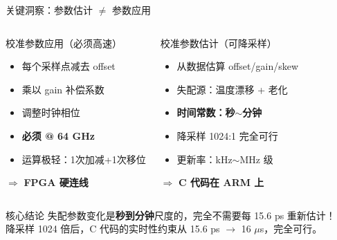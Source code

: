 \documentclass[table,UTF8,11pt,aspectratio=169]{beamer}
\begin{document}
\begin{frame}{关键洞察：参数估计 $\neq$ 参数应用}
\begin{columns}[T]
\begin{block}{校准参数应用（必须高速）}
\begin{itemize}
    \item 每个采样点减去 offset
    \item 乘以 gain 补偿系数
    \item 调整时钟相位
    \item \textbf{必须 @ 64 GHz}
    \item 运算极轻：1次加减+1次移位
\end{itemize}
\centering $\Rightarrow$ \textbf{FPGA 硬连线}
\end{block}

\begin{block}{校准参数估计（可降采样）}
\begin{itemize}
    \item 从数据估算 offset/gain/skew
    \item 失配源：温度漂移 + 老化
    \item \textbf{时间常数：秒$\sim$分钟}
    \item 降采样 1024:1 完全可行
    \item 更新率：kHz$\sim$MHz 级
\end{itemize}
\centering $\Rightarrow$ \textbf{C 代码在 ARM 上}
\end{block}
\end{columns}

\vspace{0.3cm}
\begin{alertblock}{核心结论}
失配参数变化是\textbf{秒到分钟}尺度的，完全不需要每 15.6 ps 重新估计！\\
降采样 1024 倍后，C 代码的实时性约束从 15.6 ps $\to$ 16 $\mu$s，完全可行。
\end{alertblock}
\end{frame}
\end{document}
